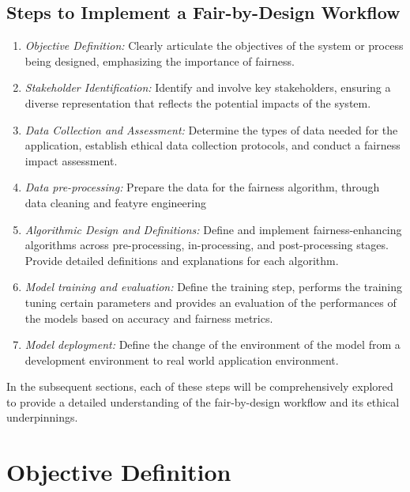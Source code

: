 \documentclass[12pt,a4paper,openright,twoside]{book}
\begin{document}
\subsection{Steps to Implement a Fair-by-Design Workflow}

\begin{enumerate}

    \item \emph{Objective Definition:} Clearly articulate the objectives of the system or process being designed, emphasizing the importance of fairness.

    \item \emph{Stakeholder Identification:} Identify and involve key stakeholders, ensuring a diverse representation that reflects the potential impacts of the system.

    \item \emph{Data Collection and Assessment:} Determine the types of data needed for the application, establish ethical data collection protocols, and conduct a fairness impact assessment.

    \item \emph{Data pre-processing:} Prepare the data for the fairness algorithm, through data cleaning and featyre engineering
    
    \item \emph{Algorithmic Design and Definitions:} Define and implement fairness-enhancing algorithms across pre-processing, in-processing, and post-processing stages. Provide detailed definitions and explanations for each algorithm.

    \item \emph{Model training and evaluation:} Define the training step, performs the training tuning certain parameters and provides an evaluation of the performances of the models based on accuracy and fairness metrics.

    \item \emph{Model deployment:} Define the change of the environment of the model from a development environment to real world application environment.

\end{enumerate}

In the subsequent sections, each of these steps will be comprehensively explored to provide a detailed understanding of the fair-by-design workflow and its ethical underpinnings.

\section{Objective Definition}
\end{document}
